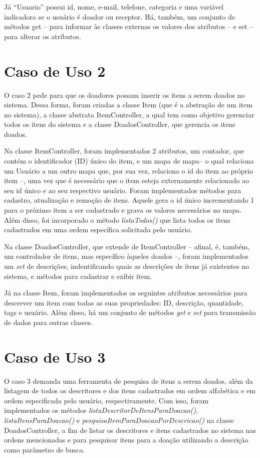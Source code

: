\documentclass[journal,12pt,onecolumn,]{article}
\begin{document}
	Já “Usuario” possui id, nome, e-mail, telefone, categoria e uma variável indicadora se o usuário é doador ou receptor. Há, também, um conjunto de métodos get -- para informar às classes externas os valores dos atributos -- e set -- para alterar os atributos.
			
	\section{Caso de Uso 2}
	O caso 2 pede para que os doadores possam inserir os itens a serem doados no sistema. Dessa forma, foram criadas a classe Item (que é a abstração de um item no sistema), a classe abstrata ItemController, a qual tem como objetivo gerenciar todos os itens do sistema e a classe DoadosController, que gerencia os itens doados.
	
	Na classe ItemController, foram implementados 2 atributos, um contador, que contém o identificador (ID) único do item, e um mapa de mapa-- o qual relaciona um Usuário a um outro mapa que, por sua vez, relaciona o id do item ao próprio item --, uma vez que é necessário que o item esteja externamente relacionado ao seu id único e ao seu respectivo usuário. Foram implementados métodos para cadastro, atualização e remoção de itens. Aquele gera o id único incrementando 1 para o próximo item a ser cadastrado e grava os valores necessários no mapa. Além disso, foi incorporado o método \textit{listaTodos()} que lista todos os itens cadastrados em uma ordem específica solicitada pelo usuário. 

	Na classe DoadosController, que extende de ItemController -- afinal, é, também, um controlador de itens, mas específico àqueles doados --, foram implementados um \textit{set} de descrições, indentificando quais as descrições de itens já existentes no sistema, e métodos para cadastrar e exibir item.

	Já na classe Item, foram implementados os seguintes atributos necessários para descrever um item com todas as suas propriedades: ID, descrição, quantidade, tags e usuário. Além disso, há um conjunto de métodos \textit{get} e \textit{set} para transmissão de dados para outras classes.
	
	
	\section{Caso de Uso 3}
	O caso 3 demanda uma ferramenta de pesquisa de itens a serem doados, além da listagem de todos os descritores e dos itens cadastrados em ordem alfabética e em ordem especificada pelo usuário, respectivamente. Com isso, foram implementados os métodos \textit{listaDescritorDeItensParaDoacao()}, \textit{listaItensParaDoacao()} e \textit{pesquisaItemParaDoacaoPorDescricao()} na classe DoadosController, a fim de listar os descritores e itens cadastrados no sistema nas ordens mencionadas e para pesquisar itens para a doação utilizando a descrição como parâmetro de busca.
	
\end{document}
